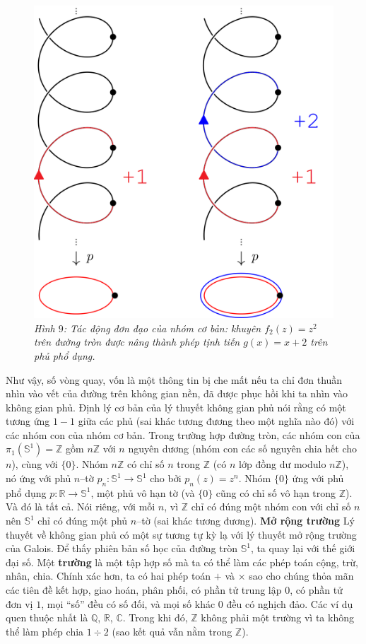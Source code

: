 \begin{multicols}{2}
\begin{figure}[H]
		\vspace*{-10pt}
		\centering
		\captionsetup{labelformat= empty, justification=centering}
		\includegraphics[width= 0.75\linewidth]{h9.png}
		\caption{\small\textit{\color{duongvaotoanhoc}Hình $9$: Tác động đơn đạo của nhóm cơ bản: khuyên $f_2(z) = z^2$ trên đường tròn được nâng thành phép tịnh tiến $g(x) = x+2$ trên phủ phổ dụng.}}
		\vspace*{-10pt}
	\end{figure}
	Như vậy, số vòng quay, vốn là một thông tin bị che mất nếu ta chỉ đơn thuần nhìn vào vết của đường trên không gian nền, đã được phục hồi khi ta nhìn vào không gian phủ.
	\vskip 0.1cm
	Định lý cơ bản của lý thuyết không gian phủ nói rằng có một tương ứng $1-1$ giữa các phủ (sai khác tương đương theo một nghĩa nào đó) với các nhóm con của nhóm cơ bản. Trong trường hợp đường tròn, các nhóm con của $\pi_1(\mathbb{S}^1) = \mathbb{Z}$ gồm $n\mathbb{Z}$ với $n$ nguyên dương (nhóm con các số nguyên chia hết cho $n$), cùng với $\{0\}$. Nhóm $n\mathbb{Z}$ có chỉ số $n$ trong $\mathbb{Z}$ (có $n$ lớp đồng dư modulo $n\mathbb{Z}$), nó ứng với phủ $n$--tờ $p_n: \mathbb{S}^1 \to \mathbb{S}^1$ cho bởi $p_n(z) = z^n$. Nhóm $\{0\}$ ứng với phủ phổ dụng $p: \mathbb{R} \to \mathbb{S}^1$, một phủ vô hạn tờ (và $\{0\}$ cũng có chỉ số vô hạn trong $\mathbb{Z}$). Và đó là tất cả. Nói riêng, với mỗi $n$, vì $\mathbb{Z}$ chỉ có đúng một nhóm con với chỉ số $n$ nên $\mathbb{S}^1$ chỉ có đúng một phủ $n$--tờ (sai khác tương đương).
	\vskip 0.1cm
	\textbf{\color{duongvaotoanhoc}Mở rộng trường}
	\vskip 0.1cm
	Lý thuyết về không gian phủ có một sự tương tự kỳ lạ với lý thuyết mở rộng trường của Galois. Để thấy phiên bản số học của đường tròn $\mathbb{S}^1$, ta quay lại với thế giới đại số. Một {\bf\color{duongvaotoanhoc} trường} là một tập hợp số mà ta có thể làm các phép toán cộng, trừ, nhân, chia. Chính xác hơn, ta có hai phép toán $+$ và $\times$ sao cho chúng thỏa mãn các tiên đề kết hợp, giao hoán, phân phối, có phần tử trung lập $0$, có phần tử đơn vị $1$, mọi ``số'' đều có số đối, và mọi số khác $0$ đều có nghịch đảo. Các ví dụ quen thuộc nhất là $\mathbb{Q}$, $\mathbb{R}$, $\mathbb{C}$. Trong khi đó, $\mathbb{Z}$ không phải một trường vì ta không thể làm phép chia $1 \div 2$ (sao kết quả vẫn nằm trong $\mathbb{Z}$).

\end{multicols}
